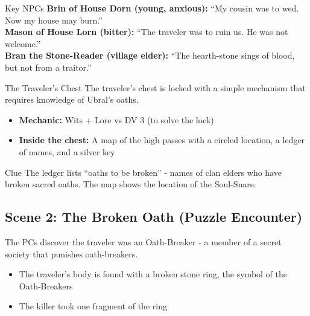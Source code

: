 \documentclass[11pt]{article}
\begin{document}
\begin{npcbox}{Key NPCs}
    \textbf{Brin of House Dorn (young, anxious):} ``My cousin was to wed. Now my house may burn.'' \\
    \textbf{Mason of House Lorn (bitter):} ``The traveler was to ruin us. He was not welcome.'' \\
    \textbf{Bran the Stone-Reader (village elder):} ``The hearth-stone sings of blood, but not from a traitor.''
\end{npcbox}

\begin{puzzlebox}{The Traveler's Chest}
The traveler's chest is locked with a simple mechanism that requires knowledge of Ubral's oaths.
\begin{itemize}
    \item \textbf{Mechanic:} Wits + Lore vs DV 3 (to solve the lock)
    \item \textbf{Inside the chest:} A map of the high passes with a circled location, a ledger of names, and a silver key
\end{itemize}
\end{puzzlebox}

\begin{cluebox}{Clue}
The ledger lists ``oaths to be broken'' - names of clan elders who have broken sacred oaths. The map shows the location of the Soul-Snare.
\end{cluebox}

\subsection*{Scene 2: The Broken Oath (Puzzle Encounter)}
The PCs discover the traveler was an Oath-Breaker - a member of a secret society that punishes oath-breakers.

\begin{itemize}
    \item The traveler's body is found with a broken stone ring, the symbol of the Oath-Breakers
    \item The killer took one fragment of the ring
\end{itemize}
\end{document}
